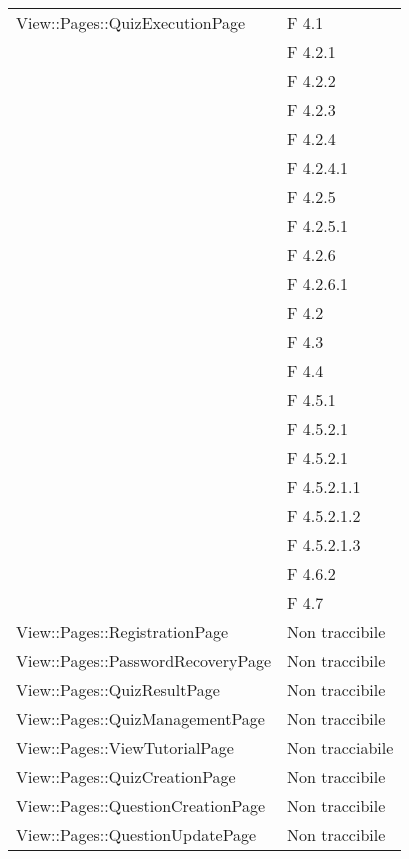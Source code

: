 \begin{longtable}{p{}p{}}
\midrule
View::Pages::QuizExecutionPage
								& F 4.1\\
								& F 4.2.1\\
								& F 4.2.2\\
								& F 4.2.3\\
								& F 4.2.4\\
								& F 4.2.4.1\\
								& F 4.2.5\\
								& F 4.2.5.1\\
								& F 4.2.6\\
								& F 4.2.6.1\\
								& F 4.2\\
								& F 4.3\\
								& F 4.4\\
								& F 4.5.1\\
								& F 4.5.2.1\\
								& F 4.5.2.1\\
								& F 4.5.2.1.1\\
								& F 4.5.2.1.2\\
								& F 4.5.2.1.3\\
								& F 4.6.2\\
& F 4.7\\

\midrule
View::Pages::RegistrationPage	& Non traccibile\\

\midrule
View::Pages::PasswordRecoveryPage	& Non traccibile\\

\midrule
View::Pages::QuizResultPage	& Non traccibile\\	
							
\midrule
View::Pages::QuizManagementPage	& Non traccibile\\

\midrule
View::Pages::ViewTutorialPage	& Non tracciabile\\

\midrule
View::Pages::QuizCreationPage	& Non traccibile\\

\midrule
View::Pages::QuestionCreationPage	& Non traccibile\\

\midrule
View::Pages::QuestionUpdatePage	& Non traccibile\\





\end{longtable}
